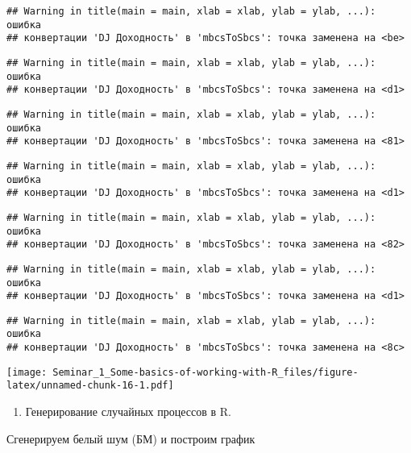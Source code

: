 \documentclass[
]{article}
\providecommand{\tightlist}{%
  \setlength{\itemsep}{0pt}\setlength{\parskip}{0pt}}
\begin{document}
\begin{verbatim}
## Warning in title(main = main, xlab = xlab, ylab = ylab, ...): ошибка
## конвертации 'DJ Доходность' в 'mbcsToSbcs': точка заменена на <be>
\end{verbatim}

\begin{verbatim}
## Warning in title(main = main, xlab = xlab, ylab = ylab, ...): ошибка
## конвертации 'DJ Доходность' в 'mbcsToSbcs': точка заменена на <d1>
\end{verbatim}

\begin{verbatim}
## Warning in title(main = main, xlab = xlab, ylab = ylab, ...): ошибка
## конвертации 'DJ Доходность' в 'mbcsToSbcs': точка заменена на <81>
\end{verbatim}

\begin{verbatim}
## Warning in title(main = main, xlab = xlab, ylab = ylab, ...): ошибка
## конвертации 'DJ Доходность' в 'mbcsToSbcs': точка заменена на <d1>
\end{verbatim}

\begin{verbatim}
## Warning in title(main = main, xlab = xlab, ylab = ylab, ...): ошибка
## конвертации 'DJ Доходность' в 'mbcsToSbcs': точка заменена на <82>
\end{verbatim}

\begin{verbatim}
## Warning in title(main = main, xlab = xlab, ylab = ylab, ...): ошибка
## конвертации 'DJ Доходность' в 'mbcsToSbcs': точка заменена на <d1>
\end{verbatim}

\begin{verbatim}
## Warning in title(main = main, xlab = xlab, ylab = ylab, ...): ошибка
## конвертации 'DJ Доходность' в 'mbcsToSbcs': точка заменена на <8c>
\end{verbatim}

\texttt{[image: Seminar\_1\_Some-basics-of-working-with-R\_files/figure-latex/unnamed-chunk-16-1.pdf]}

\begin{enumerate}
\def\labelenumi{\arabic{enumi}.}
\setcounter{enumi}{2}
\tightlist
\item
  Генерирование случайных процессов в R.
\end{enumerate}

Сгенерируем белый шум (БМ) и построим график
\end{document}
